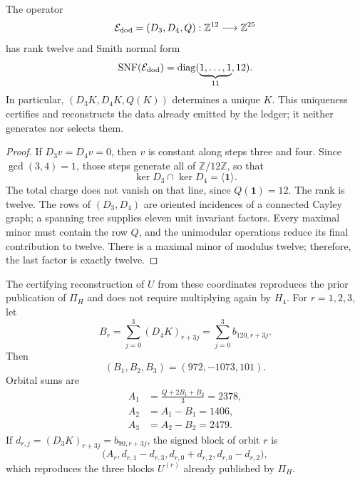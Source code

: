 \begin{theorem}
\label{p3-83-c25-s4:thm:completitud-extractor-transversal-k}
The operator
\[
 \mathcal E_{\rm dod}=(D_3,D_4,Q):
 \mathbb Z^{12}\longrightarrow\mathbb Z^{25}
\]
has rank twelve and Smith normal form
\begin{equation}
 \operatorname{SNF}(\mathcal E_{\rm dod})
 =\operatorname{diag}(\underbrace{1,\ldots,1}_{11},12).
 \label{p3-83-c25-s4:eq:snf-extractor-transversal-k}
\end{equation}
In particular, \((D_3K,D_4K,Q(K))\) determines a unique \(K\). This
uniqueness certifies and reconstructs the data already emitted by the ledger; it neither
generates nor selects them.
\end{theorem}

\begin{proof}
If \(D_3v=D_4v=0\), then \(v\) is constant along steps
three and four. Since \(\gcd(3,4)=1\), those steps generate all of
\(\mathbb Z/12\mathbb Z\), so that
\[
 \ker D_3\cap\ker D_4=\langle\mathbf1\rangle.
\]
The total charge does not vanish on that line, since \(Q(\mathbf1)=12\). The rank
is twelve. The rows of \((D_3,D_4)\) are oriented incidences of a connected
Cayley graph; a spanning tree supplies eleven unit
invariant factors. Every maximal minor must contain the row \(Q\), and the
unimodular operations reduce its final contribution to twelve. There is a maximal minor of
modulus twelve; therefore, the last factor is exactly twelve.
\end{proof}

The certifying reconstruction of \(U\) from these coordinates reproduces the
prior publication of \(\Pi_H\) and does not require multiplying again by
\(H_4\). For \(r=1,2,3\), let
\begin{equation}
 B_r=\sum_{j=0}^{3}(D_4K)_{r+3j}
 =\sum_{j=0}^{3}b_{120,r+3j}.
 \label{p3-83-c25-s4:eq:br-diferencias-k}
\end{equation}
Then
\[
 (B_1,B_2,B_3)=(972,-1073,101).
\]
Orbital sums are
\begin{align}
 A_1&=\frac{Q+2B_1+B_2}{3}=2378,
 \label{p3-83-c25-s4:eq:a1-reconstruccion-u}\\
 A_2&=A_1-B_1=1406,
 \label{p3-83-c25-s4:eq:a2-reconstruccion-u}\\
 A_3&=A_2-B_2=2479.
 \label{p3-83-c25-s4:eq:a3-reconstruccion-u}
\end{align}
If \(d_{r,j}=(D_3K)_{r+3j}=b_{90,r+3j}\), the signed block of orbit
\(r\) is
\begin{equation}
 \bigl(A_r,
 d_{r,1}-d_{r,3},
 d_{r,0}+d_{r,2},
 d_{r,0}-d_{r,2}\bigr),
 \label{p3-83-c25-s4:eq:bloque-firmado-desde-diferencias}
\end{equation}
which reproduces the three blocks \(U^{(r)}\) already published by \(\Pi_H\).

